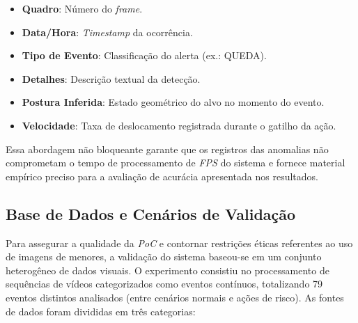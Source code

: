 \documentclass[12pt]{article}
\begin{document}
\begin{itemize}

    \item \textbf{Quadro}: Número do \textit{frame}.
    
    \item \textbf{Data/Hora}: \textit{Timestamp} da ocorrência.
    
    \item \textbf{Tipo de Evento}: Classificação do alerta (ex.: QUEDA).
    
    \item \textbf{Detalhes}: Descrição textual da detecção.
    
    \item \textbf{Postura Inferida}: Estado geométrico do alvo no momento do evento.
    
    \item \textbf{Velocidade}: Taxa de deslocamento registrada durante o gatilho da ação.
    
\end{itemize}
Essa abordagem não bloqueante garante que os registros das anomalias não comprometam o tempo de
processamento de \textit{FPS} do sistema e fornece material empírico preciso para a avaliação
de acurácia apresentada nos resultados.


\subsection{Base de Dados e Cenários de Validação}

Para assegurar a qualidade da \textit{PoC} e contornar restrições éticas referentes ao uso de
imagens de menores, a validação do sistema baseou-se em um conjunto heterogêneo de dados visuais.
O experimento consistiu no processamento de sequências de vídeos categorizados como eventos 
contínuos, totalizando 79 eventos distintos analisados (entre cenários normais e ações de risco).
As fontes de dados foram divididas em três categorias:
\end{document}
